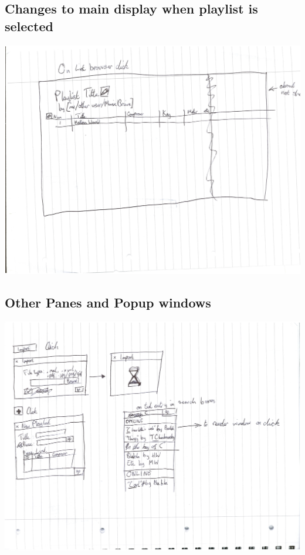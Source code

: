 \documentclass[bibtotocnumbered]{article}
\begin{document}
\begin{appendices}
\subsection{Changes to main display when playlist is selected}
\includegraphics[width=500pt]{playlist_view.png}
\subsection{Other Panes and Popup windows}
\includegraphics[width=500pt]{other_panes_and_popups}
\end{appendices}
\end{document}
